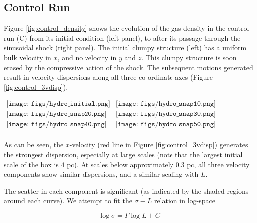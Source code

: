 \documentclass[a4paper,fleqn,usenatbib]{mnras}
\begin{document}
\subsection{Control Run}

\noindent Figure \ref{fig:control_density} shows the evolution of the gas density in the control run (C) from its initial condition (left panel), to after its passage through the sinusoidal shock (right panel).  The initial clumpy structure (left) has a uniform bulk velocity in $x$, and no velocity in $y$ and $z$. This clumpy structure is soon erased by the compressive action of the shock.  The subsequent motions generated result in velocity dispersions along all three co-ordinate axes (Figure \ref{fig:control_3vdisp}).  

\begin{figure*}
\begin{center}
$\begin{array}{cc}
\texttt{[image: figs/hydro\_initial.png]} &
\texttt{[image: figs/hydro\_snap10.png]} \\
\texttt{[image: figs/hydro\_snap20.png]} &
\texttt{[image: figs/hydro\_snap30.png]} \\
\texttt{[image: figs/hydro\_snap40.png]} &
\texttt{[image: figs/hydro\_snap50.png]} \\
\end{array}$
\end{center}
\caption{The evolution of the clumpy box of gas as it passes through the sinusoidal shock in the control simulation (C).  The initial conditions are shown in the top left panel.  The shock is parallel to the y-axis, located at $x=2$. \label{fig:control_density}}
\end{figure*}

As can be seen, the $x$-velocity (red line in Figure \ref{fig:control_3vdisp}) generates the strongest dispersion, especially at large scales (note that the largest initial scale of the box is $4$ pc).  At scales below approximately 0.3 pc, all three velocity components show similar dispersions, and a similar scaling with $L$.  

The scatter in each component is significant (as indicated by the shaded regions around each curve).  We attempt to fit the $\sigma-L$ relation in log-space

\begin{equation}
\log \sigma = \Gamma \log L + C
\end{equation}
\end{document}
